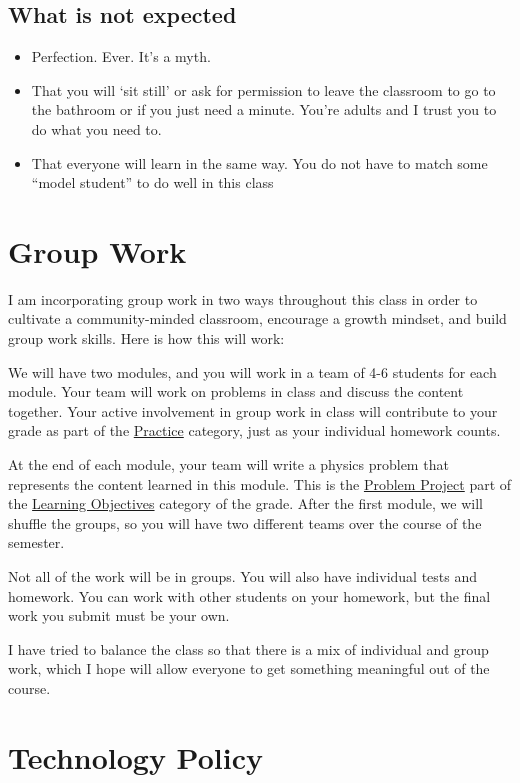 \documentclass[
  letterpaper,
  DIV=11,
  numbers=noendperiod]{scrartcl}
\providecommand{\tightlist}{%
  \setlength{\itemsep}{0pt}\setlength{\parskip}{0pt}}
\begin{document}
\subsection{What is not expected}

\begin{itemize}
\tightlist
\item
  Perfection. Ever. It's a myth.
\item
  That you will `sit still' or ask for permission to leave the classroom
  to go to the bathroom or if you just need a minute. You're adults and
  I trust you to do what you need to.
\item
  That everyone will learn in the same way. You do not have to match
  some ``model student'' to do well in this class
\end{itemize}

\section{Group Work}\label{groupwork}

I am incorporating group work in two ways throughout this class in order
to cultivate a community-minded classroom, encourage a growth mindset,
and build group work skills. Here is how this will work:

We will have two modules, and you will work in a team of 4-6 students
for each module. Your team will work on problems in class and discuss
the content together. Your active involvement in group work in class
will contribute to your grade as part of the
\hyperref[practicegrade]{Practice} category, just as your individual
homework counts.

At the end of each module, your team will write a physics problem that
represents the content learned in this module. This is the
\hyperref[problemproject]{Problem Project} part of the
\hyperref[LOgrade]{Learning Objectives} category of the grade. After the
first module, we will shuffle the groups, so you will have two different
teams over the course of the semester.

Not all of the work will be in groups. You will also have individual
tests and homework. You can work with other students on your homework,
but the final work you submit must be your own.

I have tried to balance the class so that there is a mix of individual
and group work, which I hope will allow everyone to get something
meaningful out of the course.

\section{Technology Policy}\label{techpolicy}
\end{document}
